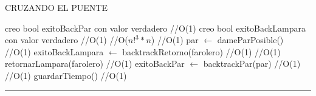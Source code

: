 \begin{algorithm}[H]
\caption{CRUZANDO EL PUENTE}
\begin{algorithmic}[1]
\state creo bool exitoBackPar con valor verdadero \hfill //O(1)
\state creo bool exitoBackLampara con valor verdadero \hfill //O(1)
 \hfill //O($n!^{3} \ast n$)
 \hfill //O(1)
\state par $\gets$ dameParPosible() \hfill //O(1)
\Else
\state exitoBackLampara $\gets$ backtrackRetorno(farolero) \hfill //O(1)
\endif
{} \hfill //O(1)
\state retornarLampara(farolero) \hfill //O(1)
\Else
\state exitoBackPar $\gets$ backtrackPar(par) \hfill //O(1)
\endif
{} \hfill //O(1)
\state guardarTiempo() \hfill //O(1)
\endif
\endwhile
\EndFunction 
\end{algorithmic}
\hrule
{}
\end{algorithm}


